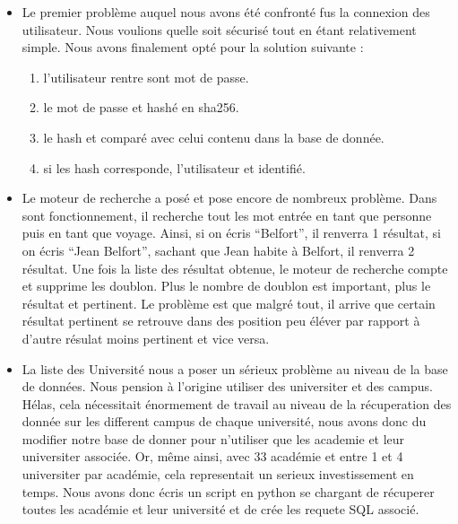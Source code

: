 \documentclass[a4paper,10pt]{report}
\begin{document}
\begin{itemize}
    \item Le premier probl\`eme auquel nous avons \'et\'e confront\'e fus la connexion des utilisateur.
    Nous voulions quelle soit s\'ecuris\'e tout en \'etant relativement simple.
    Nous avons finalement opt\'e pour la solution suivante : 
    \begin{enumerate}
        \item l'utilisateur rentre sont mot de passe.
        \item le mot de passe et hash\'e en sha256.
        \item le hash et compar\'e avec celui contenu dans la base de donn\'ee.
        \item si les hash corresponde, l'utilisateur et identifi\'e.
    \end{enumerate}
    
    \null
    
    \item Le moteur de recherche a pos\'e et pose encore de nombreux probl\`eme.
    Dans sont fonctionnement, il recherche tout les mot entr\'ee en tant que
    personne puis en tant que voyage. Ainsi, si on \'ecris ``Belfort'', il renverra 1 r\'esultat,
    si on \'ecris ``Jean Belfort'', sachant que Jean habite \`a Belfort, il renverra 2 r\'esultat.
    Une fois la liste des r\'esultat obtenue, le moteur de recherche compte et supprime
    les doublon. Plus le nombre de doublon est important, plus le r\'esultat et pertinent.
    Le probl\`eme est que malgr\'e tout, il arrive que certain r\'esultat pertinent se
    retrouve dans des position peu \'el\'ever par rapport \`a d'autre r\'esulat moins pertinent
    et vice versa.
    
    \null
    
    \item La liste des Universit\'e nous a poser un s\'erieux probl\`eme au niveau de la
    base de donn\'ees. Nous pension \`a l'origine utiliser des universiter et des campus.
    H\'elas, cela n\'ecessitait \'enormement de travail au niveau de la r\'ecuperation
    des donn\'ee sur les different campus de chaque universit\'e, nous avons donc du
    modifier notre base de donner pour n'utiliser que les academie et leur universiter
    associ\'ee. Or, m\^eme ainsi, avec 33 acad\'emie et entre 1 et 4 universiter par
    acad\'emie, cela representait un serieux investissement en temps. Nous avons donc
    \'ecris un script en python se chargant de r\'ecuperer toutes les acad\'emie et
    leur universit\'e et de cr\'ee les requete SQL associ\'e.
    

\end{itemize}
\end{document}
